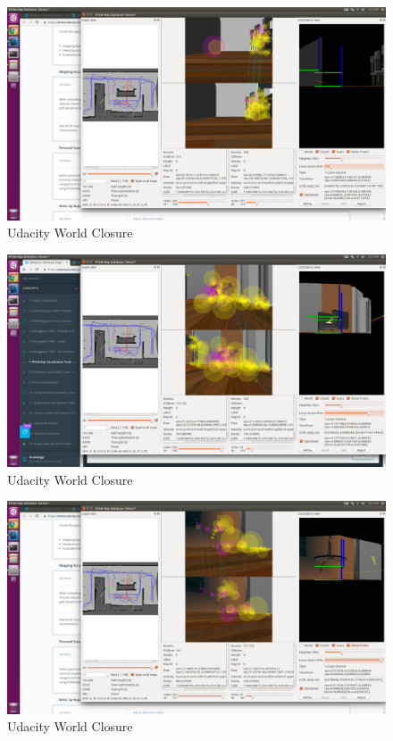\documentclass[10pt,journal,compsoc]{IEEEtran}
\begin{document}
\begin{figure}[thpb]
    \centering
    \includegraphics[width=\linewidth]{closure_1}
    \caption{Udacity World Closure}
    \label{fig:closure 1}
\end{figure}

\begin{figure}[thpb]
    \centering
    \includegraphics[width=\linewidth]{closure_2}
    \caption{Udacity World Closure}
    \label{fig:closure 2}
\end{figure}

\begin{figure}[thpb]
    \centering
    \includegraphics[width=\linewidth]{closure_3}
    \caption{Udacity World Closure}
    \label{fig:closure 3}
\end{figure}
\end{document}
